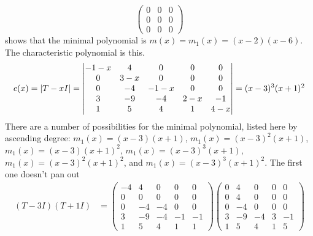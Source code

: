\begin{exercises}
\begin{answer}
\begin{exparts}
\begin{equation*}
\begin{pmatrix}
             0  &0  &0  \\
             0  &0  &0   \\
             0  &0  &0
           \end{pmatrix}
         \end{equation*}
         shows that the minimal polynomial is
         $m(x)=m_1(x)=(x-2)(x-6)$.
       \partsitem The characteristic polynomial is this.
         \begin{equation*}
           c(x)=\deter{T-xI}=
           \begin{vmatrix} 
              -1-x &4    &0    &0    &0    \\
               0   &3-x  &0    &0    &0    \\
               0   &-4   &-1-x &0    &0    \\
               3   &-9   &-4   &2-x  &-1   \\
               1   &5    &4    &1    &4-x
           \end{vmatrix}     
           =(x-3)^3(x+1)^2
         \end{equation*}
         There are a number of possibilities for the minimal polynomial,
         listed here by ascending degree:
         $m_1(x)=(x-3)(x+1)$, $m_1(x)=(x-3)^2(x+1)$, $m_1(x)=(x-3)(x+1)^2$, 
         $m_1(x)=(x-3)^3(x+1)$, $m_1(x)=(x-3)^2(x+1)^2$, 
         and $m_1(x)=(x-3)^3(x+1)^2$. 
         The first one doesn't pan out
         \begin{align*}
           (T-3I)(T+1I)
           &=
           \begin{pmatrix} 
              -4   &4    &0    &0    &0    \\
               0   &0    &0    &0    &0    \\
               0   &-4   &-4   &0    &0    \\
               3   &-9   &-4   &-1   &-1   \\
               1   &5    &4    &1    &1  
           \end{pmatrix}     
           \begin{pmatrix} 
               0   &4    &0    &0    &0    \\
               0   &4    &0    &0    &0    \\
               0   &-4   &0    &0    &0    \\
               3   &-9   &-4   &3    &-1   \\
               1   &5    &4    &1    &5  
           \end{pmatrix}                           \\     

\end{align*}
\end{exparts}
\end{answer}
\end{exercises}
